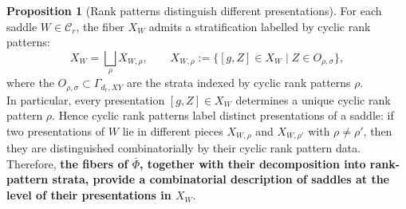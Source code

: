 \documentclass{article}
\theoremstyle{definition}
\newtheorem{proposition}[theorem]{Proposition}
\begin{document}
\begin{proposition}[Rank patterns distinguish different presentations]
For each saddle \(W\in \mathcal C_r\), the fiber \(X_W\) admits a stratification labelled by cyclic rank patterns:
\[
X_W=\bigsqcup_{\rho} X_{W,\rho},
\qquad
X_{W,\rho}:=\{[g,Z]\in X_W \mid Z\in O_{\rho,\sigma}\},
\]
where the \(O_{\rho,\sigma}\subset \Gamma_{d_r,XY}\) are the strata indexed by
cyclic rank patterns \(\rho\).
\\
\noindent
In particular, every presentation \([g,Z]\in X_W\) determines a unique cyclic
rank pattern \(\rho\). Hence cyclic rank patterns label distinct presentations
of a saddle: if two presentations of \(W\) lie in different pieces
\(X_{W,\rho}\) and \(X_{W,\rho'}\) with \(\rho\neq \rho'\), then they are
distinguished combinatorially by their cyclic rank pattern data.
\\
\noindent
Therefore, \textbf{the fibers of \(\bar\Phi\), together with their decomposition into
rank-pattern strata, provide a combinatorial description of saddles at the
level of their presentations in $ X_W$}.
\end{proposition}
\end{document}
